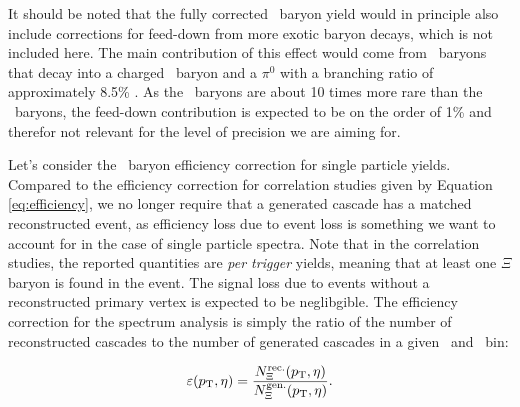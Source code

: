 It should be noted that the fully corrected \Xi\ baryon yield would in principle also include corrections for feed-down from more exotic baryon decays, which is not included here. The main contribution of this effect would come from \Omega\ baryons that decay into a charged \Xi\ baryon and a $\pi^0$ with a branching ratio of approximately 8.5\% \cite{PDG2024}. As the \Omega\ baryons are about 10 times more rare than the \Xi\ baryons, the feed-down contribution is expected to be on the order of 1\% and therefor not relevant for the level of precision we are aiming for.

Let's consider the \Xi\ baryon efficiency correction for single particle yields. Compared to the efficiency correction for correlation studies given by Equation \ref{eq:efficiency}, we no longer require that a generated cascade has a matched reconstructed event, as efficiency loss due to event loss is something we want to account for in the case of single particle spectra. Note that in the correlation studies, the reported quantities are \textit{per trigger} yields, meaning that at least one $\Xi$ baryon is found in the event. The signal loss due to events without a reconstructed primary vertex is expected to be neglibgible.
The efficiency correction for the spectrum analysis is simply the ratio of the number of reconstructed cascades to the number of generated cascades in a given \pt\ and \eta\ bin:

  \begin{align}
    \epsilon(\pt, \eta) = \frac{N^\text{rec.}_\Xi(\pt, \eta)}{N^\text{gen.}_\Xi(\pt, \eta)}. \label{eq:efficiency_spectra}
  \end{align}

